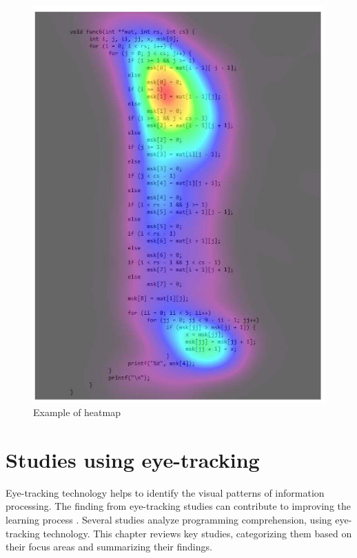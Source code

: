 \begin{figure} [H]
  \centering
  \includegraphics[scale=1]{figures/hm.png}
  \caption{Example of heatmap \cite[p. 13]{jbara2017programmers}}
  \label{fig:AnhangsChor}
\end{figure}



\section{Studies using eye-tracking}


Eye-tracking technology helps to identify the visual patterns of information processing. 
The finding from eye-tracking studies can contribute to improving the learning process \cite{andrzejewska2020development}. Several studies analyze programming comprehension, using eye-tracking technology. This chapter reviews key studies, categorizing them based on their focus areas and summarizing their findings.

